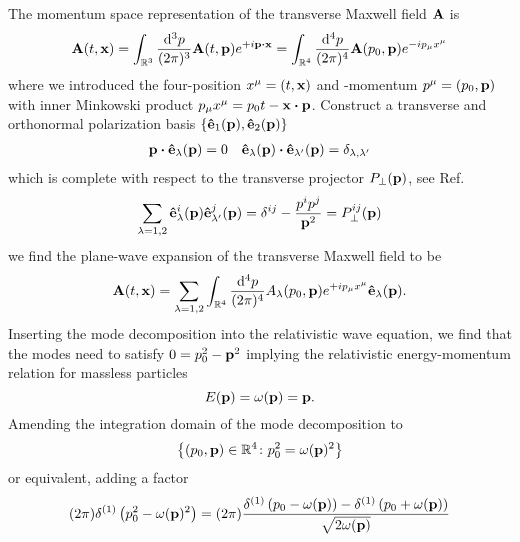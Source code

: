 The momentum space representation of the transverse Maxwell field $\vb{A}$ is
\begin{equation}
	\vb{A}(t,\vb{x})
	=
	\int_{\mathbb{R}^3}
	\frac{\dd[3]{p}}{(2\pi)^3}
	\vb{A}(t,\vb{p})
	e^{+i\vb{p}\vdot\vb{x}}
	=
	\int_{\mathbb{R}^4}
	\frac{\dd[4]{p}}{(2\pi)^4}
	\vb{A}(p_0,\vb{p})
	e^{-ip_\mu x^\mu}
\end{equation}
where we introduced the four-position $x^\mu=(t,\vb{x})$ and -momentum $p^\mu=(p_0,\vb{p})$ with inner Minkowski product $p_\mu x^\mu=p_0t-\vb{x}\vdot\vb{p}$.
Construct a transverse and orthonormal polarization basis $\left\{\vu{e}_1(\vb{p}),\vu{e}_2(\vb{p})\right\}$
\begin{align}
	\vb{p}\vdot\vu{e}_\lambda(\vb{p})
	=
	0
	&&
	\vu{e}_\lambda(\vb{p})
	\vdot
	\vu{e}_{\lambda^\prime}(\vb{p})
	=
	\delta_{\lambda,\lambda^\prime}
\end{align}
which is complete with respect to the transverse projector $P_\perp(\vb{p})$, see Ref.~\cite[p.~341]{Srednicki2007}
\begin{equation}
	\sum_{\lambda=1,2}
	\vu{e}_\lambda^i(\vb{p})
	\vu{e}_{\lambda^\prime}^j(\vb{p})
	=
	\delta^{ij}
	-
	\frac{p^ip^j}{\vb{p}^2}
	=
	P_\perp^{ij}(\vb{p})
\end{equation}
we find the plane-wave expansion of the transverse Maxwell field to be~\cite[p.~154]{Greiner2013}
\begin{equation}
	\vb{A}(t,\vb{x})
	=
	\sum_{\lambda=1,2}
	\int_{\mathbb{R}^4}\frac{\dd[4]{p}}{(2\pi)^4}
	A_\lambda(p_0,\vb{p})
	e^{+ip_\mu x^\mu}
	\vu{e}_\lambda(\vb{p})
	.
\end{equation}
Inserting the mode decomposition into the relativistic wave equation, we find that the modes need to satisfy $0=p_0^2-\vb{p}^2$ implying the relativistic energy-momentum relation for massless particles
\begin{equation}
	E(\vb{p})
	=
	\omega(\vb{p})
	=
	\vb{p}
	.
\end{equation}
Amending the integration domain of the mode decomposition to
\begin{equation}
	\left\{
		(p_0,\vb{p})\in\mathbb{R}^4
		\colon
		p_0^2
		=
		\omega(\vb{p})^2
	\right\}
\end{equation}
or equivalent, adding a factor
\begin{equation}
	(2\pi)
	\delta^{(1)}\left(p_0^2-\omega(\vb{p})^2\right)
	=
	(2\pi)
	\frac{
		\delta^{(1)}\left(p_0-\omega(\vb{p})\right)
		-
		\delta^{(1)}\left(p_0+\omega(\vb{p})\right)
	}{\sqrt{2\omega(\vb{p})}}
\end{equation}
